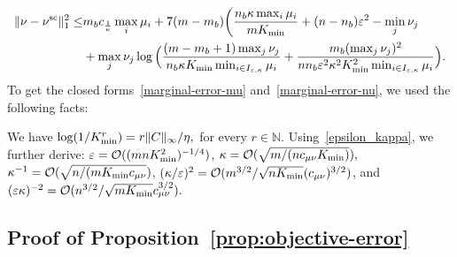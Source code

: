 \begin{align*}
\norm{{\nu} -{\nu}^{\text{sc}}}^2_1 \leq & m_bc_{\frac 1\kappa}\max_{i} \mu_i + 7(m-m_b)\bigg(\frac{n_b\kappa\max_{i}\mu_i}{mK_{\min}} + (n- n_b) \varepsilon^2 - \min_{j}\nu_j\\
&+ \max_{j} \nu_j\log\Big(\frac{(m-m_b+ 1)\max_{j} \nu_j}{n_b\kappa K_{\min}\min_{i \in I_{\varepsilon,\kappa}}\mu_i} + \frac{m_b(\max_{j} \nu_j)^2}{nn_b\varepsilon^2\kappa^2K_{\min}^2\min_{i \in I_{\varepsilon,\kappa}}\mu_i}\Big).%
\end{align*}
To get the closed forms~\eqref{marginal-error-mu} and~\eqref{marginal-error-nu}, we used the following facts:
\begin{remark}
\label{rem:orders_of_epsilonappa}
 We have $\log(1/K_{\min}^r) = r\|C\|_\infty /\eta,$ for every $r \in \mathbb{N}$. Using~\eqref{epsilon_kappa}, we further derive: 
$\varepsilon = \mathcal{O}((mnK_{\min}^2)^{-1/4})$, $\kappa= \mathcal{O}(\sqrt{m/(nc_{\mu\nu}K_{\min})}),$ $\kappa^{-1} = \mathcal{O}(\sqrt{n/(mK_{\min}c_{\mu\nu}})$, $(\kappa/\varepsilon)^2 = \mathcal{O}( m^{3/2} / \sqrt{nK_{\min}}(c_{\mu\nu})^{3/2})$, and $(\varepsilon\kappa)^{-2} = \mathcal{O}(n^{3/2}/\sqrt{mK_{\min}}c^{3/2}_{\mu\nu}).$
\end{remark}

\subsection{Proof of Proposition~\ref{prop:objective-error}}

